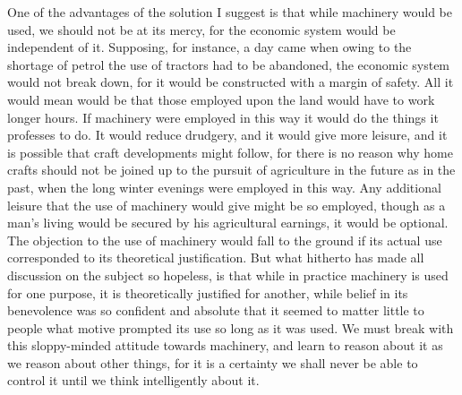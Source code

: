 \documentclass{book}
\begin{document}
One of the advantages of the solution I suggest is that while machinery would be used, we should not be at its mercy, for the economic system would be independent of it. Supposing, for instance, a day came when owing to the shortage of petrol the use of tractors had to be abandoned, the economic system would not break down, for it would be constructed with a margin of safety. All it would mean would be that those employed upon the land would have to work longer hours. If machinery were employed in this way it would do the things it professes to do. It would reduce drudgery, and it would give more leisure, and it is possible that craft developments might follow, for there is no reason why home crafts should not be joined up to the pursuit of agriculture in the future as in the past, when the long winter evenings were employed in this way. Any additional leisure that the use of machinery would give might be so employed, though as a man’s living would be secured by his agricultural earnings, it would be optional. The objection to the use of machinery would fall to the ground if its actual use corresponded to its theoretical justification. But what hitherto has made all discussion on the subject so hopeless, is that while in practice machinery is used for one purpose, it is theoretically justified for another, while belief in its benevolence was so confident and absolute that it seemed to matter little to people what motive prompted its use so long as it was used. We must break with this sloppy-minded attitude towards machinery, and learn to reason about it as we reason about other things, for it is a certainty we shall never be able to control it until we think intelligently about it.
\end{document}
